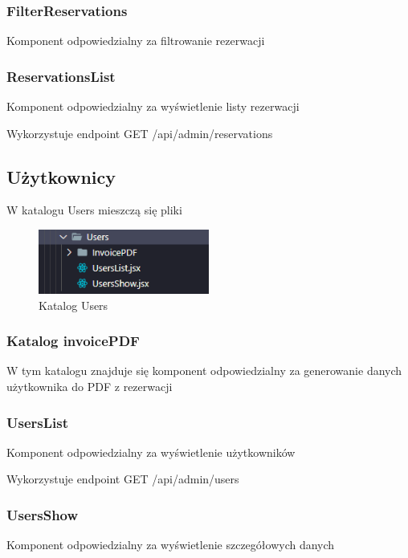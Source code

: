 \documentclass[titlepage]{article}
\begin{document}
\subsubsection{FilterReservations}
Komponent odpowiedzialny za filtrowanie rezerwacji

\subsubsection{ReservationsList}
Komponent odpowiedzialny za wyświetlenie listy rezerwacji

\newline
Wykorzystuje endpoint GET /api/admin/reservations

\subsection{Użytkownicy}
W katalogu Users mieszczą się pliki

\begin{figure}[h]
\centering
\includegraphics[width=0.5\textwidth]{users-admin.png}

\caption{Katalog Users}
\label{fig:obrazek Users}
\end{figure}

\subsubsection{Katalog invoicePDF}
W tym katalogu znajduje się komponent odpowiedzialny za generowanie danych użytkownika do PDF z rezerwacji 

\subsubsection{UsersList}
Komponent odpowiedzialny za wyświetlenie użytkowników

\newline
Wykorzystuje endpoint GET /api/admin/users

\subsubsection{UsersShow}
Komponent odpowiedzialny za wyświetlenie szczegółowych danych
\end{document}
